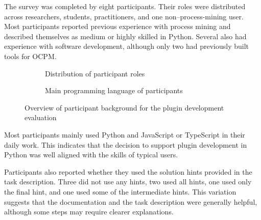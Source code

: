The survey was completed by eight participants.
Their roles were distributed across researchers, students, practitioners, and one non–process-mining user.
Most participants reported previous experience with process mining and described themselves as medium or highly skilled in Python.
Several also had experience with software development, although only two had previously built tools for OCPM.

\begin{figure}[h]
	\centering

	\begin{subfigure}[c]{0.48\textwidth}
		\centering
		\caption{Distribution of participant roles}
		\label{fig:role-distribution-pie-plugin}
	\end{subfigure}
	\hfill
	\begin{subfigure}[c]{0.48\textwidth}
		\centering
		\caption{Main programming language of participants}
	\end{subfigure}

	\caption{Overview of participant background for the plugin development evaluation}
\end{figure}

Most participants mainly used Python and JavaScript or TypeScript in their daily work.
This indicates that the decision to support plugin development in Python was well aligned with the skills of typical users.

Participants also reported whether they used the solution hints provided in the task description. Three did not use any hints, two used all hints, one used only the final hint, and one used some of the intermediate hints. This variation suggests that the documentation and the task description were generally helpful, although some steps may require clearer explanations.

